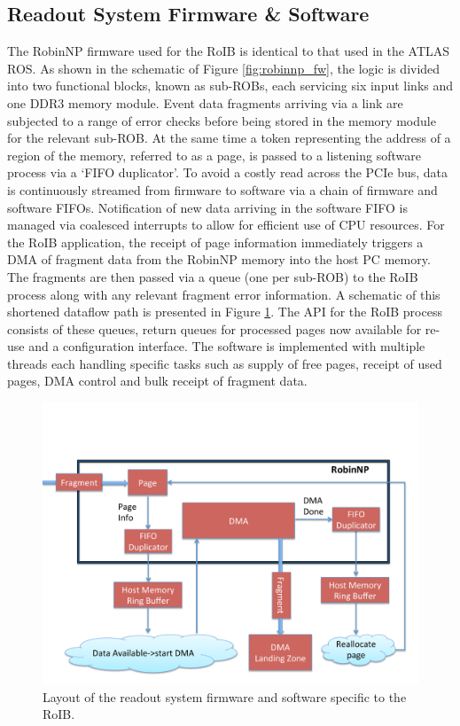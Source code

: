 \documentclass{JINST}
\begin{document}
\subsection{Readout System Firmware \& Software}\label{sec:crorc_fw}

The RobinNP firmware used for the RoIB is identical to that used in the ATLAS ROS\cite{ros}. As shown in 
the schematic of Figure \ref{fig:robinnp_fw}, the logic is divided into two functional blocks, known as sub-ROBs, 
each servicing six input links and one DDR3 memory module. Event data fragments arriving via a link are subjected 
to a range of error checks before being stored in the memory module for the relevant sub-ROB. At the same time a token
representing the address of a region of the memory, referred to as a page, is passed to a listening software process via 
a `FIFO duplicator'. To avoid a costly read across the PCIe bus, data is continuously streamed from firmware to 
software via a chain of firmware and software FIFOs. Notification of new data arriving in the software FIFO is managed via coalesced 
interrupts to allow for efficient use of CPU resources.
For the RoIB application, the receipt of page information immediately triggers a DMA of fragment data from the RobinNP memory into 
the host PC memory. The fragments are then passed via a queue (one per sub-ROB) to the RoIB process along with any relevant fragment 
error information. A schematic of this shortened dataflow path is presented in Figure \ref{fig:roib_swfw}. 
The API for the RoIB process consists of these queues, return queues for processed pages now available for re-use and 
a configuration interface. The software is implemented with multiple threads each handling specific tasks such as supply of free pages, receipt
of used pages, DMA control and bulk receipt of fragment data.


\begin{figure}[tbp] %
\centering
\includegraphics[trim = 0cm 0cm 0cm 5cm, width=.7\textwidth]{figures/RobinNP_Software}
\caption{Layout of the readout system firmware and software specific to the RoIB.}
\label{fig:roib_swfw}
\end{figure}
\end{document}
